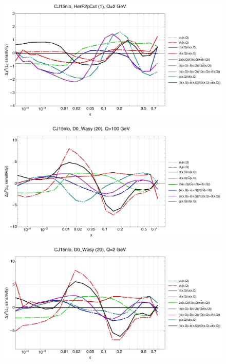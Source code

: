 \documentclass[10pt,aps,prd,floatfix,titlepage]{revtex4}
\begin{document}
\begin{figure}
\includegraphics[width=\textwidth,height=0.44\textheight,keepaspectratio]{2/1_CJ15nlo_q2_Sf_2.pdf}
\caption{}
\end{figure}
\clearpage
\begin{figure}
\includegraphics[width=\textwidth,height=0.44\textheight,keepaspectratio]{2/20_CJ15nlo_q100_Sf_2.pdf}
\caption{}
\end{figure}
\begin{figure}
\includegraphics[width=\textwidth,height=0.44\textheight,keepaspectratio]{2/20_CJ15nlo_q2_Sf_2.pdf}
\caption{}
\end{figure}
\end{document}
